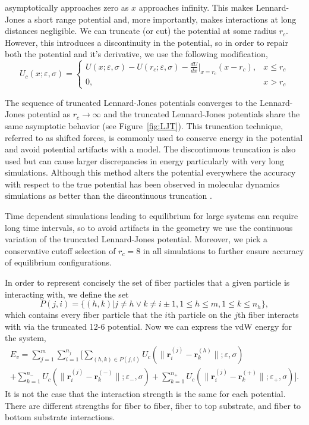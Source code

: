 \noindent	
asymptotically approaches zero as $x$ approaches infinity. This makes Lennard-Jones a short range potential and, more importantly, makes interactions at long distances negligible. We can truncate (or cut) the potential at some radius $r_c$. However, this introduces a discontinuity in the potential, so in order to repair both the potential and it's derivative, we use the following modification,
\begin{equation}
	U_c(x; \varepsilon, \sigma) = \left\{ 
		\begin{array}{lr}
			U(x; \varepsilon, \sigma) - U(r_c; \varepsilon, \sigma) - \frac{dU}{dx}\bigg|_{x = r_c}(x - r_c), & x \leq r_c\\
			0, & x > r_c
		\end{array}
		\right. 
\end{equation}

\enlargethispage{-\baselineskip}
The sequence of truncated Lennard-Jones potentials converges to the Lennard-Jones potential as $r_c \to \infty$ and the truncated Lennard-Jones potentials share the same asymptotic behavior (see Figure~\ref{fig:LJT}). This truncation technique, referred to as shifted forces, is commonly used to conserve energy in the potential and avoid potential artifacts with a model. The discontinuous truncation is also used but can cause larger discrepancies in energy particularly with very long simulations. Although this method alters the potential everywhere the accuracy with respect to the true potential has been observed in molecular dynamics simulations as better than the discontinuous truncation \cite{Toxvaerd2011}.

\enlargethispage{\baselineskip}
Time dependent simulations leading to equilibrium for large systems can require long time intervals, so to avoid artifacts in the geometry we use the continuous variation of the truncated Lennard-Jones potential. Moreover, we pick a conservative cutoff selection of $r_c = 8$ in all simulations to further ensure accuracy of equilibrium configurations.

In order to represent concisely the set of fiber particles that a given particle is interacting with, we define the set
\begin{equation}
	P(j,i) = \{ (h,k)|j \neq h \vee k \neq i \pm 1, 1 \leq h \leq m, 1 \leq k \leq n_h \},
\end{equation}
which contains every fiber particle that the $i$th particle on the $j$th fiber interacts with via the truncated 12-6 potential. Now we can express the vdW energy for the system,
\begin{multline}
	E_v = \sum_{j=1}^m \sum_{i=1}^{n_j} \bigg[ \sum_{(h,k) \in P(j,i)} U_c \left( \| \textbf{r}_i^{(j)} - \textbf{r}_k^{(h)} \|; \varepsilon, \sigma \right) \\ + \sum_{k=1}^{n_-} U_c \left( \| \textbf{r}_i^{(j)} - \textbf{r}_k^{(-)} \|; \varepsilon_-, \sigma \right) + \sum_{k=1}^{n_+} U_c \left( \| \textbf{r}_i^{(j)} - \textbf{r}_k^{(+)} \|; \varepsilon_+, \sigma \right) \bigg].
\end{multline}
It is not the case that the interaction strength is the same for each potential. There are different strengths for fiber to fiber, fiber to top substrate, and fiber to bottom substrate interactions.

